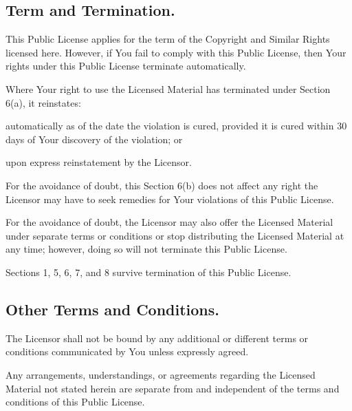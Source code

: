   \subsection{Term and Termination.}
    \begin{myEnumerate}
      \item This Public License applies for the term of the Copyright and Similar Rights licensed here. However, if You fail
      to comply with this Public License, then Your rights under this Public License terminate automatically.
      \item Where Your right to use the Licensed Material has terminated under Section 6(a), it reinstates:
      \begin{myEnumerate}
        \item automatically as of the date the violation is cured, provided it is cured within 30 days of Your discovery of
        the violation; or
        \item upon express reinstatement by the Licensor.
      \end{myEnumerate}
      For the avoidance of doubt, this Section 6(b) does not affect any right the Licensor may have to seek remedies for Your
      violations of this Public License.
      \item For the avoidance of doubt, the Licensor may also offer the Licensed Material under separate terms or conditions
      or stop distributing the Licensed Material at any time; however, doing so will not terminate this Public License.
      \item Sections 1, 5, 6, 7, and 8 survive termination of this Public License.
    \end{myEnumerate}

  \subsection{Other Terms and Conditions.}
    \begin{myEnumerate}
      \item The Licensor shall not be bound by any additional or different terms or conditions communicated by You unless
      expressly agreed.
      \item Any arrangements, understandings, or agreements regarding the Licensed Material not stated herein are separate
      from and independent of the terms and conditions of this Public License.
    \end{myEnumerate}

